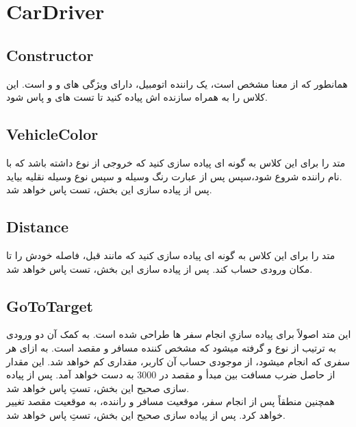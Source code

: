     \newpage
    
\section{CarDriver}
    \subsection{Constructor}
    همانطور که از معنا مشخص است، یک راننده اتومبیل، دارای ویژگی های 
    و
    و
    است.
     این کلاس را به همراه سازنده اش پیاده کنید تا تست های
    \grayBox{\textcolor{dkgreen}{CarDriverInheritedInterfacesTest}}
    و
    \grayBox{\textcolor{dkgreen}{CarDriverConstructorTest}}
    پاس شود.
    
    \subsection{VehicleColor}
    متد 
    را برای این کلاس به گونه ای پیاده سازی کنید که خروجی از نوع
    \grayBox{\textcolor{blue}{string}}
    داشته باشد که با نام راننده شروع شود،سپس پس از عبارت
    رنگ وسیله و سپس نوع وسیله نقلیه بیاید.
    \\
    پس از پیاده سازی این بخش، تست 
    \grayBox{\textcolor{dkgreen}{CarDriverVehicleTest}}
    پاس خواهد شد.
    
    \subsection{Distance}
    متد 
    را برای این کلاس به گونه ای پیاده سازی کنید که 
    مانند قبل، فاصله خودش را تا مکان ورودی حساب کند.
    پس از پیاده سازی این بخش، تست 
    \grayBox{\textcolor{dkgreen}{CarDriverDistanceTest}}
    پاس خواهد شد.
    
    \subsection{GoToTarget}
    این متد اصولاً برای پیاده سازیِ انجام سفر ها طراحی شده است. به کمک آن دو ورودی به ترتیب از نوع
    و
    گرفته میشود 
    که مشخص کننده مسافر و مقصد است.
    به ازای هر سفری که انجام میشود، از موجودی حساب آن کاربر، مقداری کم خواهد شد.
    این مقدار از حاصل ضرب مسافت بین مبدأ و مقصد در 3000 به دست خواهد آمد.
     پس از پیاده سازی صحیح این بخش، تستِ    \grayBox{\textcolor{dkgreen}{CarDriverGoToTargetTest}}
    پاس خواهد شد.
    \\
    همچنین منطقاً پس از انجام سفر، موقعیت مسافر و راننده، به موقعیت مقصد تغییر خواهد کرد.
    پس از پیاده سازی صحیح این بخش، تستِ    \grayBox{\textcolor{dkgreen}{CarDriverLocationTest}}
    پاس خواهد شد.
    
